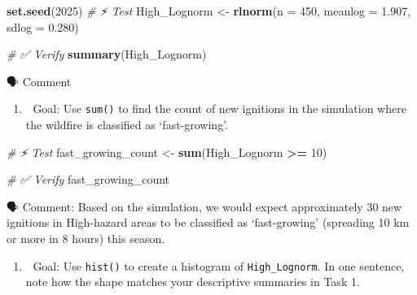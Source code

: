 \documentclass[
  12pt,
]{scrreprt}
\newenvironment{Shaded}{\begin{snugshade}}{\end{snugshade}}
\newcommand{\AttributeTok}[1]{\textcolor[rgb]{0.13,0.29,0.53}{#1}}
\newcommand{\CommentTok}[1]{\textcolor[rgb]{0.56,0.35,0.01}{\textit{#1}}}
\newcommand{\DecValTok}[1]{\textcolor[rgb]{0.00,0.00,0.81}{#1}}
\newcommand{\FloatTok}[1]{\textcolor[rgb]{0.00,0.00,0.81}{#1}}
\newcommand{\FunctionTok}[1]{\textcolor[rgb]{0.13,0.29,0.53}{\textbf{#1}}}
\newcommand{\NormalTok}[1]{#1}
\newcommand{\OtherTok}[1]{\textcolor[rgb]{0.56,0.35,0.01}{#1}}
\newcommand{\SpecialCharTok}[1]{\textcolor[rgb]{0.81,0.36,0.00}{\textbf{#1}}}
\providecommand{\tightlist}{%
  \setlength{\itemsep}{0pt}\setlength{\parskip}{0pt}}
\begin{document}
\begin{Shaded}
\begin{Highlighting}[]
\FunctionTok{set.seed}\NormalTok{(}\DecValTok{2025}\NormalTok{)}
\CommentTok{\# ⚡ Test}
\NormalTok{High\_Lognorm }\OtherTok{\textless{}{-}} \FunctionTok{rlnorm}\NormalTok{(}\AttributeTok{n =} \DecValTok{450}\NormalTok{, }\AttributeTok{meanlog =} \FloatTok{1.907}\NormalTok{, }\AttributeTok{sdlog =} \FloatTok{0.280}\NormalTok{)}
\end{Highlighting}
\end{Shaded}

\begin{Shaded}
\begin{Highlighting}[]
\CommentTok{\# ✅  Verify}
\FunctionTok{summary}\NormalTok{(High\_Lognorm)}
\end{Highlighting}
\end{Shaded}

🗣 Comment

\begin{enumerate}
\def\labelenumi{\arabic{enumi}.}
\setcounter{enumi}{1}
\tightlist
\item
  🎯 Goal: Use \texttt{sum()} to find the count of new ignitions in the simulation where the wildfire is classified as `fast-growing'.
\end{enumerate}

\begin{Shaded}
\begin{Highlighting}[]
\CommentTok{\# ⚡ Test}
\NormalTok{fast\_growing\_count }\OtherTok{\textless{}{-}} \FunctionTok{sum}\NormalTok{(High\_Lognorm }\SpecialCharTok{\textgreater{}=} \DecValTok{10}\NormalTok{)}
\end{Highlighting}
\end{Shaded}

\begin{Shaded}
\begin{Highlighting}[]
\CommentTok{\# ✅  Verify}
\NormalTok{fast\_growing\_count}
\end{Highlighting}
\end{Shaded}

🗣 Comment: Based on the simulation, we would expect approximately 30 new ignitions in High-hazard areas to be classified as `fast-growing' (spreading 10 km or more in 8 hours) this season.

\begin{enumerate}
\def\labelenumi{\arabic{enumi}.}
\setcounter{enumi}{2}
\tightlist
\item
  🎯 Goal: Use \texttt{hist()} to create a histogram of \texttt{High\_Lognorm}. In one sentence, note how the shape matches your descriptive summaries in Task 1.
\end{enumerate}
\end{document}
